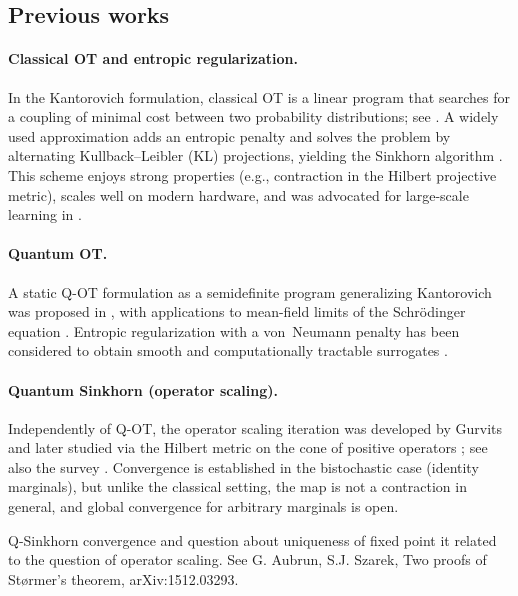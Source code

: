 \documentclass[10pt]{article}
\theoremstyle{plain}
\theoremstyle{definition}
\theoremstyle{remark}
\begin{document}
\subsection{Previous works}

\paragraph{Classical OT and entropic regularization.}
In the Kantorovich formulation, classical OT is a linear program that searches for a coupling of minimal cost between two probability distributions; see \cite{santambrogio2015optimal}. A widely used approximation adds an entropic penalty and solves the problem by alternating Kullback--Leibler (KL) projections, yielding the Sinkhorn algorithm \cite{Sinkhorn64}. This scheme enjoys strong properties (e.g., contraction in the Hilbert projective metric), scales well on modern hardware, and was advocated for large-scale learning in \cite{Cuturi13}.

\paragraph{Quantum OT.}
A static Q-OT formulation as a semidefinite program generalizing Kantorovich was proposed in \cite{ning2014matrix}, with applications to mean-field limits of the Schr\"odinger equation \cite{golse2016mean,caglioti2019quantum}. Entropic regularization with a von~Neumann penalty has been considered to obtain smooth and computationally tractable surrogates \cite{chakrabarti2019quantum,peyre2019quantum}.

\paragraph{Quantum Sinkhorn (operator scaling).}
Independently of Q-OT, the operator scaling iteration was developed by Gurvits \cite{gurvits2000deterministic,gurvits2003classical,gurvits2004classical} and later studied via the Hilbert metric on the cone of positive operators \cite{georgiou2015positive,idel2013structure}; see also the survey \cite{garg2018recent}. Convergence is established in the bistochastic case (identity marginals), but unlike the classical setting, the map is not a contraction in general, and global convergence for arbitrary marginals is open.

Q-Sinkhorn convergence and question about uniqueness of fixed point it related to the question of operator scaling. 
%
See G. Aubrun, S.J. Szarek, Two proofs of Størmer's theorem, arXiv:1512.03293.
\end{document}
